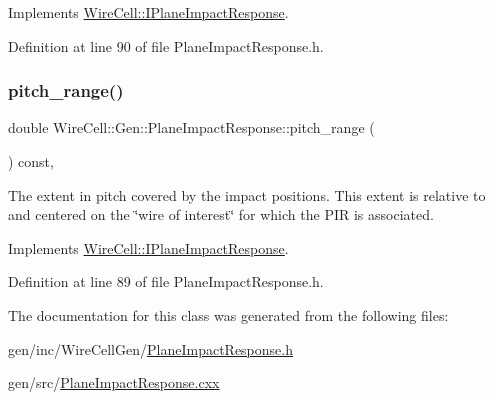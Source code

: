 Implements \hyperlink{class_wire_cell_1_1_i_plane_impact_response_ad8fcf3440976f14b05debbbf6d743d88}{Wire\+Cell\+::\+I\+Plane\+Impact\+Response}.



Definition at line 90 of file Plane\+Impact\+Response.\+h.

\mbox{\label{class_wire_cell_1_1_gen_1_1_plane_impact_response_a6d35e0f23850e8b5922216bae603af5e}} 
\subsubsection{\texorpdfstring{pitch\+\_\+range()}{pitch\_range()}}
{\footnotesize\ttfamily double Wire\+Cell\+::\+Gen\+::\+Plane\+Impact\+Response\+::pitch\+\_\+range (\begin{DoxyParamCaption}{ }\end{DoxyParamCaption}) const\hspace{0.3cm}{\ttfamily [inline]}, {\ttfamily [virtual]}}

The extent in pitch covered by the impact positions. This extent is relative to and centered on the \char`\"{}wire of
interest\char`\"{} for which the P\+IR is associated. 

Implements \hyperlink{class_wire_cell_1_1_i_plane_impact_response_a2145d23de537013749fb0cbe822ad7c2}{Wire\+Cell\+::\+I\+Plane\+Impact\+Response}.



Definition at line 89 of file Plane\+Impact\+Response.\+h.



The documentation for this class was generated from the following files\+:\begin{DoxyCompactItemize}
\item 
gen/inc/\+Wire\+Cell\+Gen/\hyperlink{_plane_impact_response_8h}{Plane\+Impact\+Response.\+h}\item 
gen/src/\hyperlink{_plane_impact_response_8cxx}{Plane\+Impact\+Response.\+cxx}\end{DoxyCompactItemize}
